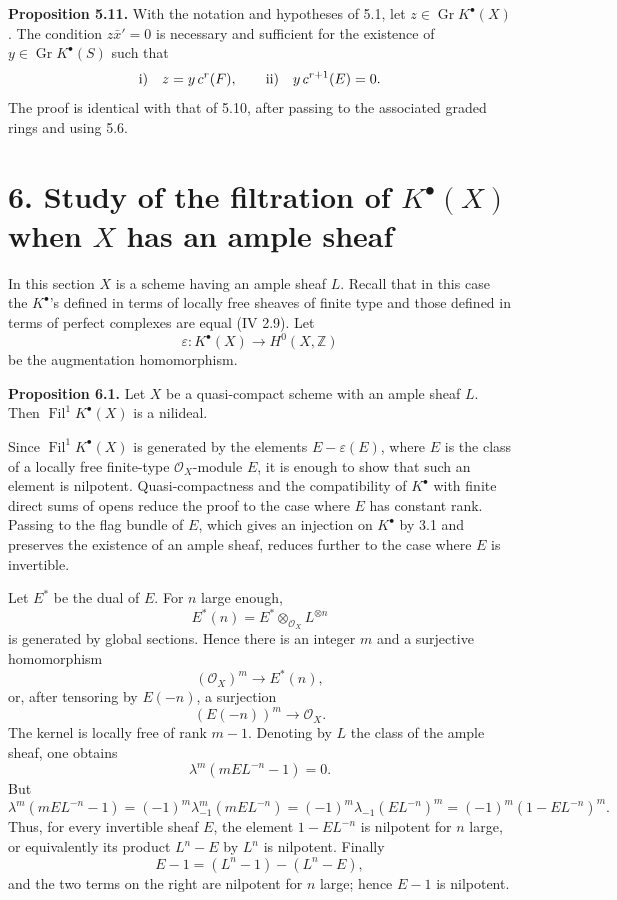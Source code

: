 \documentclass[11pt]{article}
\newcommand{\Fil}{\operatorname{Fil}}
\begin{document}
\textbf{Proposition 5.11.} With the notation and hypotheses of 5.1, let \(z\in\operatorname{Gr}K^\bullet(X)\). The condition \(z\bar x'=0\) is necessary and sufficient for the existence of \(y\in\operatorname{Gr}K^\bullet(S)\) such that
\[
  \text{\rm i)}\quad z=y\,c^r(F),
  \qquad
  \text{\rm ii)}\quad y\,c^{r+1}(E)=0.
\]
The proof is identical with that of 5.10, after passing to the associated graded rings and using 5.6.

\section*{6. Study of the filtration of \(K^\bullet(X)\) when \(X\) has an ample sheaf}

In this section \(X\) is a scheme having an ample sheaf \(L\). Recall that in this case the \(K^\bullet\)'s defined in terms of locally free sheaves of finite type and those defined in terms of perfect complexes are equal (IV 2.9). Let
\[
  \varepsilon:K^\bullet(X)\longrightarrow H^0(X,\mathbb Z)
\]
be the augmentation homomorphism.

\textbf{Proposition 6.1.} Let \(X\) be a quasi-compact scheme with an ample sheaf \(L\). Then \(\Fil^1K^\bullet(X)\) is a nilideal.

Since \(\Fil^1K^\bullet(X)\) is generated by the elements \(E-\varepsilon(E)\), where \(E\) is the class of a locally free finite-type \(\mathcal O_X\)-module \(E\), it is enough to show that such an element is nilpotent. Quasi-compactness and the compatibility of \(K^\bullet\) with finite direct sums of opens reduce the proof to the case where \(E\) has constant rank. Passing to the flag bundle of \(E\), which gives an injection on \(K^\bullet\) by 3.1 and preserves the existence of an ample sheaf, reduces further to the case where \(E\) is invertible.

Let \(E^*\) be the dual of \(E\). For \(n\) large enough,
\[
  E^*(n)=E^*\otimes_{\mathcal O_X}L^{\otimes n}
\]
is generated by global sections. Hence there is an integer \(m\) and a surjective homomorphism
\[
  (\mathcal O_X)^m\longrightarrow E^*(n),
\]
or, after tensoring by \(E(-n)\), a surjection
\[
  (E(-n))^m\longrightarrow \mathcal O_X .
\]
The kernel is locally free of rank \(m-1\). Denoting by \(L\) the class of the ample sheaf, one obtains
\[
  \lambda^m(mEL^{-n}-1)=0.
\]
But
\[
 \lambda^m(mEL^{-n}-1)=(-1)^m\lambda_{-1}^m(mEL^{-n})
 =(-1)^m\lambda_{-1}(EL^{-n})^m
 =(-1)^m(1-EL^{-n})^m.
\]
Thus, for every invertible sheaf \(E\), the element \(1-EL^{-n}\) is nilpotent for \(n\) large, or equivalently its product \(L^n-E\) by \(L^n\) is nilpotent. Finally
\[
  E-1=(L^n-1)-(L^n-E),
\]
and the two terms on the right are nilpotent for \(n\) large; hence \(E-1\) is nilpotent.
\end{document}
